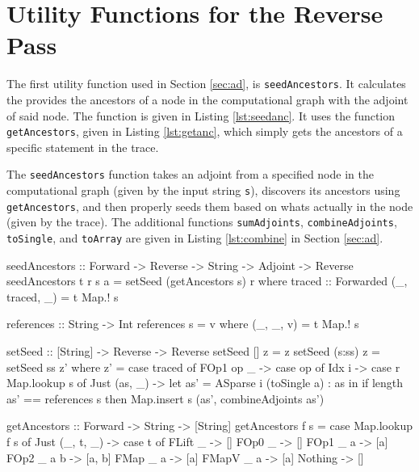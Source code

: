 \section{Utility Functions for the Reverse Pass} \label{app:utility}
    The first utility function used in Section \ref{sec:ad}, is \texttt{seedAncestors}.
    It calculates the provides the ancestors of a node in the computational graph with the adjoint of said node.
    The function is given in Listing \ref{lst:seedanc}.
    It uses the function \texttt{getAncestors}, given in Listing \ref{lst:getanc}, which simply gets the ancestors of a specific statement in the trace.
    
    The \texttt{seedAncestors} function takes an adjoint from a specified node in the computational graph (given by the input string \texttt{s}), discovers its ancestors using \texttt{getAncestors}, and then properly seeds them based on whats actually in the node (given by the trace).
    The additional functions \texttt{sumAdjoints}, \texttt{combineAdjoints}, \texttt{toSingle}, and \texttt{toArray} are given in Listing \ref{lst:combine} in Section \ref{sec:ad}.

    \begin{haskell}[caption=Function for seeding ancestors of a node, label=lst:seedanc, gobble=8]
        seedAncestors :: Forward -> Reverse -> String -> Adjoint -> Reverse
        seedAncestors t r s a = setSeed (getAncestors s) r
            where
                traced :: Forwarded
                (_, traced, _) = t Map.! s

                references :: String -> Int
                references s = v
                    where (_, _, v) = t Map.! s

                setSeed :: [String] -> Reverse -> Reverse
                setSeed []     z = z
                setSeed (s:ss) z = setSeed ss z'
                    where z' = case traced of
                        FOp1 op _ -> case op of
                            Idx i -> case r Map.lookup s of
                                Just (as, _) ->
                                    let as' = ASparse i (toSingle a) : as
                                    in  if   length as' == references s
                                        then Map.insert s (as', combineAdjoints as')
    \end{haskell}

    \begin{haskell}[caption=Function to get ancestors from a node in the trace, label=lst:getanc, gobble=8]
        getAncestors :: Forward -> String -> [String]
        getAncestors f s = case Map.lookup f s of
            Just (_, t, _) -> case t of
                FLift _     -> []
                FOp0  _     -> []
                FOp1  _ a   -> [a]
                FOp2  _ a b -> [a, b]
                FMap  _ a   -> [a]
                FMapV _ a   -> [a]
            Nothing        -> []
    \end{haskell}